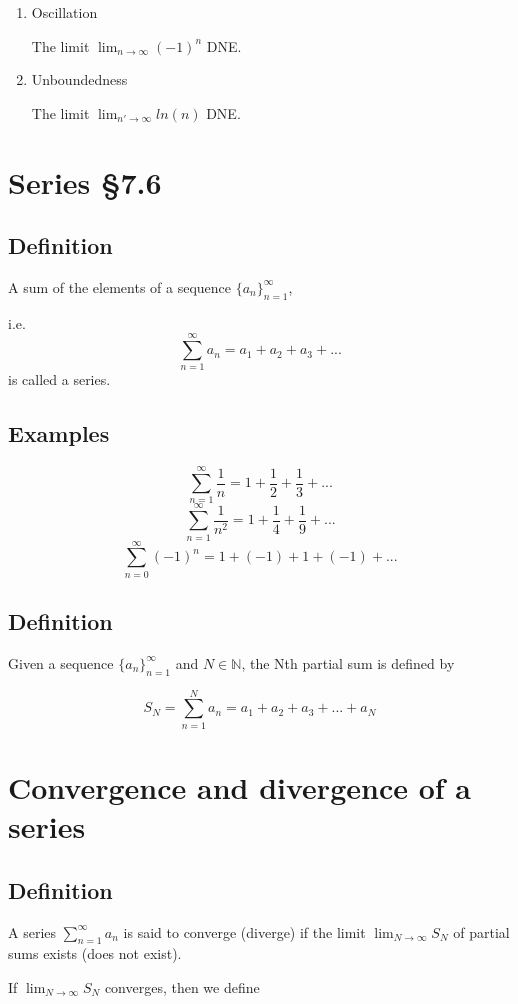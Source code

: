 \documentclass[11pt]{article}
\newcommand{\naturals}{\mathbb{N}}
\begin{document}
\begin{enumerate}
\item Oscillation

The limit $\lim_{n\rightarrow\infty}(-1)^n$ DNE.

\item Unboundedness

The limit $\lim_{n'\rightarrow\infty}ln(n)$ DNE.
\end{enumerate}

\section{Series §7.6}
\subsection*{Definition}
A sum of the elements of a sequence $\{ a_n \}_{n=1}^\infty$,

i.e.
\[ \sum_{n=1}^\infty a_n = a_1 + a_2 + a_3 + ... \]
is called a series.

\subsection*{Examples}
\[ \sum_{n=1}^\infty \frac{1}{n} = 1 + \frac{1}{2} + \frac{1}{3} + ... \]
\[ \sum_{n=1}^\infty \frac{1}{n^2} = 1 + \frac{1}{4} + \frac{1}{9} + ... \]
\[ \sum_{n=0}^\infty (-1)^n = 1 + (-1) + 1 + (-1) + ... \]

\subsection*{Definition}
Given a sequence $\{ a_n \}_{n=1}^\infty$ and $N\in\naturals$, the Nth partial sum is defined by

\[ S_N = \sum_{n=1}^N a_n = a_1 + a_2 + a_3 + ... + a_N \]

\section{Convergence and divergence of a series}
\subsection*{Definition}
A series $ \sum_{n=1}^\infty a_n $ is said to converge (diverge) if the limit $\lim_{N\rightarrow\infty}S_N$ of partial sums exists (does not exist).

If $\lim_{N\rightarrow\infty}S_N$ converges, then we define
\end{document}
